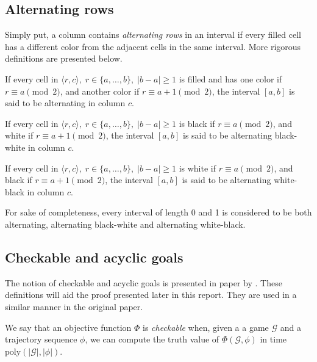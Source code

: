 \subsection{Alternating rows}
Simply put, a column contains \textit{alternating rows} in an interval if every filled cell has a different color from the adjacent cells in the same interval. More rigorous definitions are presented below.

\begin{defn}
If every cell in $\langle r, c \rangle, \; r \in \{a, \ldots, b\}, \; |b-a| \geq 1$ is filled and has one color if $r \equiv a \pmod{2}$, and another color if $r \equiv a + 1 \pmod{2}$, the interval $\left[ a, b \right]$ is said to be alternating in column $c$.
\end{defn}

\bigbreak

\begin{defn}
If every cell in $\langle r, c \rangle, \; r \in \{a, \ldots, b\}, \; |b-a| \geq 1$ is black if $r \equiv a \pmod{2}$, and white if $r \equiv a + 1 \pmod{2}$, the interval $\left[ a, b \right]$ is said to be alternating black-white in column $c$.
\end{defn}

\bigbreak

\begin{defn}
If every cell in $\langle r, c \rangle, \; r \in \{a, \ldots, b\}, \; |b-a| \geq 1$ is white if $r \equiv a \pmod{2}$, and black if $r \equiv a + 1 \pmod{2}$, the interval $\left[ a, b \right]$ is said to be alternating white-black in column $c$.
\end{defn}

For sake of completeness, every interval of length 0 and 1 is considered to be both alternating, alternating black-white and alternating white-black.

\subsection{Checkable and acyclic goals}
The notion of checkable and acyclic goals is presented in paper by \citeauthor{tetris}. These definitions will aid the proof presented later in this report. They are used in a similar manner in the original paper.\\

\begin{defn}
\label{defn:checkable}
We say that an objective function $\Phi$ is \textit{checkable} when, given a a game $\mathcal{G}$ and a trajectory sequence $\phi$, we can compute the truth value of $\Phi(\mathcal{G}, \phi)$ in time $\text{poly}(|\mathcal{G}|, |\phi|)$.
\end{defn}

